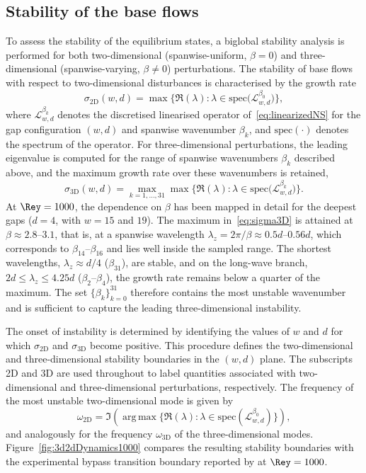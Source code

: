 \documentclass[lineno]{jfm}
\DeclareMathOperator{\argmax}{arg\,max}
\begin{document}
\subsection{Stability of the base flows}
To assess the stability of the equilibrium states, a biglobal stability analysis is performed for both two-dimensional (spanwise-uniform, $\beta=0$) and three-dimensional (spanwise-varying, $\beta\neq0$) perturbations. The stability of base flows with respect to two-dimensional disturbances is characterised by the growth rate
\begin{equation}
	\sigma_{\mathrm{2D}}(w,d)
	=
	\max
	\big\{
	\Re(\lambda):
	\lambda\in
	\mathrm{spec}\big(
	\mathcal{L}_{w,d}^{\beta_0}
	\big)
	\big\},
\end{equation}
where $\mathcal{L}_{w,d}^{\beta_k}$ denotes the discretised linearised operator of~\eqref{eq:linearizedNS} for the gap configuration $(w,d)$ and spanwise wavenumber $\beta_k$, and $\mathrm{spec}(\cdot)$ denotes the spectrum of the operator. For three-dimensional perturbations, the leading eigenvalue is computed for the range of spanwise wavenumbers $\beta_k$ described above, and the maximum growth rate over these wavenumbers is retained,
\begin{equation}\label{eq:sigma3D}
	\sigma_{\mathrm{3D}}(w,d)
	=
	\max_{k=1,\ldots,31}
	\max
	\big\{
	\Re(\lambda):
	\lambda\in
	\mathrm{spec}\big(
		\mathcal{L}_{w,d}^{\beta_k}
	\big)
	\big\}.
\end{equation}
At $\Rey=1000$, the dependence on $\beta$ has been mapped in detail for the deepest gaps ($d=4$, with $w=15$ and $19$). The maximum in~\eqref{eq:sigma3D} is attained at $\beta\approx2.8$--$3.1$, that is, at a spanwise wavelength $\lambda_z=2\pi/\beta\approx0.5d$--$0.56d$, which corresponds to $\beta_{14}$--$\beta_{16}$ and lies well inside the sampled range. The shortest wavelengths, $\lambda_z\approx d/4$ ($\beta_{31}$), are stable, and on the long-wave branch, $2d\leq\lambda_z\leq4.25d$ ($\beta_2$--$\beta_4$), the growth rate remains below a quarter of the maximum. The set $\{\beta_k\}_{k=0}^{31}$ therefore contains the most unstable wavenumber and is sufficient to capture the leading three-dimensional instability.

The onset of instability is determined by identifying the values of $w$ and $d$ for which $\sigma_{\mathrm{2D}}$ and $\sigma_{\mathrm{3D}}$ become positive. This procedure defines the two-dimensional and three-dimensional stability boundaries in the $(w,d)$ plane. The subscripts 2D and 3D are used throughout to label quantities associated with two-dimensional and three-dimensional perturbations, respectively. The frequency of the most unstable two-dimensional mode is given by
\begin{equation}
	\omega_{\mathrm{2D}}
	=
	\Im\left(\argmax\big\{\Re(\lambda) : \lambda \in\mathrm{spec}(\mathcal{L}_{w,d}^{\beta_0})\big\}\right),
\end{equation}
and analogously for the frequency $\omega_\mathrm{3D}$ of the three-dimensional modes. Figure~\ref{fig:3d2dDynamics1000} compares the resulting stability boundaries with the experimental bypass transition boundary reported by \citet{jeffGaps} at $\Rey=1000$.
\end{document}
